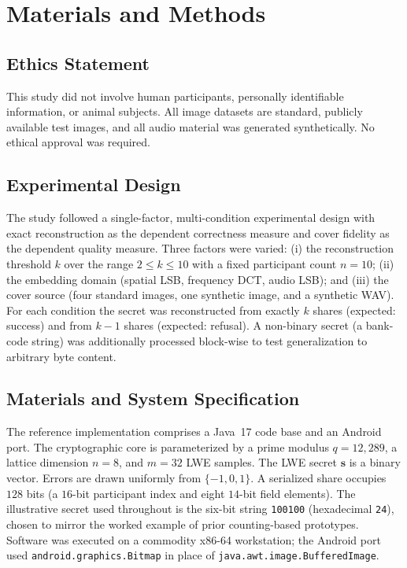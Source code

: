 \documentclass[runningheads]{llncs}
\begin{document}
\section{Materials and Methods}
\label{sec:methods}

\subsection{Ethics Statement}

This study did not involve human participants, personally identifiable
information, or animal subjects. All image datasets are standard, publicly
available test images, and all audio material was generated synthetically. No
ethical approval was required.

\subsection{Experimental Design}

The study followed a single-factor, multi-condition experimental design with
exact reconstruction as the dependent correctness measure and cover fidelity as
the dependent quality measure. Three factors were varied: (i) the
reconstruction threshold $k$ over the range $2 \le k \le 10$ with a fixed
participant count $n = 10$; (ii) the embedding domain (spatial LSB, frequency
DCT, audio LSB); and (iii) the cover source (four standard images, one
synthetic image, and a synthetic WAV). For each condition the secret was
reconstructed from exactly $k$ shares (expected: success) and from $k-1$ shares
(expected: refusal). A non-binary secret (a bank-code string) was additionally
processed block-wise to test generalization to arbitrary byte content.

\subsection{Materials and System Specification}

The reference implementation comprises a Java~17 code base and an Android port.
The cryptographic core is parameterized by a prime modulus $q = 12{,}289$, a
lattice dimension $n = 8$, and $m = 32$ LWE samples. The LWE secret $\mathbf{s}$
is a binary vector. Errors are drawn uniformly from $\{-1,0,1\}$. A serialized
share occupies $128$ bits (a $16$-bit participant index and eight $14$-bit
field elements). The illustrative secret used throughout is the six-bit string
\texttt{100100} (hexadecimal \texttt{24}), chosen to mirror the worked example
of prior counting-based prototypes. Software was executed on a commodity
x86-64 workstation; the Android port used \texttt{android.graphics.Bitmap} in
place of \texttt{java.awt.image.BufferedImage}.
\end{document}
